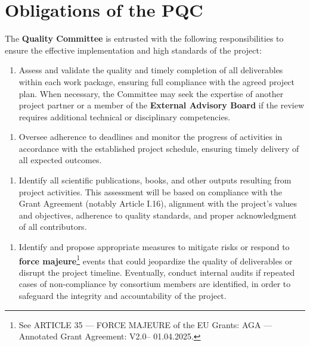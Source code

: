 \documentclass[
  12pt,
  oneside]{book}
\providecommand{\tightlist}{%
  \setlength{\itemsep}{0pt}\setlength{\parskip}{0pt}}\usepackage{longtable,booktabs,array}
\begin{document}
\section{Obligations of the PQC}\label{obligations-of-the-pqc}

The \textbf{Quality Committee} is entrusted with the following
responsibilities to ensure the effective implementation and high
standards of the project:

\begin{enumerate}
\def\labelenumi{\arabic{enumi}.}
\tightlist
\item
  Assess and validate the quality and timely completion of all
  deliverables within each work package, ensuring full compliance with
  the agreed project plan. When necessary, the Committee may seek the
  expertise of another project partner or a member of the
  \textbf{External Advisory Board} if the review requires additional
  technical or disciplinary competencies.
\end{enumerate}

\begin{enumerate}
\def\labelenumi{\arabic{enumi}.}
\tightlist
\item
  Oversee adherence to deadlines and monitor the progress of activities
  in accordance with the established project schedule, ensuring timely
  delivery of all expected outcomes.
\end{enumerate}

\begin{enumerate}
\def\labelenumi{\arabic{enumi}.}
\tightlist
\item
  Identify all scientific publications, books, and other outputs
  resulting from project activities. This assessment will be based on
  compliance with the Grant Agreement (notably Article I.16), alignment
  with the project's values and objectives, adherence to quality
  standards, and proper acknowledgment of all contributors.
\end{enumerate}

\begin{enumerate}
\def\labelenumi{\arabic{enumi}.}
\tightlist
\item
  Identify and propose appropriate measures to mitigate risks or respond
  to \textbf{force majeure}\footnote{See ARTICLE 35 --- FORCE MAJEURE of
    the EU Grants: AGA --- Annotated Grant Agreement: V2.0-- 01.04.2025.}
  events that could jeopardize the quality of deliverables or disrupt
  the project timeline. Eventually, conduct internal audits if repeated
  cases of non-compliance by consortium members are identified, in order
  to safeguard the integrity and accountability of the project.
\end{enumerate}
\end{document}
